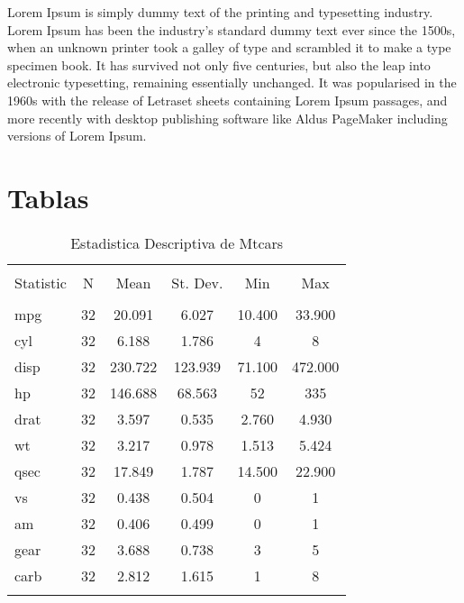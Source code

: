 \documentclass{article}
\begin{document}
\begin{blockquote}
Lorem Ipsum is simply dummy text of the printing and typesetting industry. Lorem Ipsum has been the industry's standard dummy text ever since the 1500s, when an unknown printer took a galley of type and scrambled it to make a type specimen book. It has survived not only five centuries, but also the leap into electronic typesetting, remaining essentially unchanged. It was popularised in the 1960s with the release of Letraset sheets containing Lorem Ipsum passages, and more recently with desktop publishing software like Aldus PageMaker including versions of Lorem Ipsum.
\end{blockquote}

\section{Tablas}

\begin{table}[!htbp] \centering 
  \caption{Estadistica Descriptiva de Mtcars} 
  \label{} 
\begin{tabular}{@{\extracolsep{5pt}}lccccc} 
\\[-1.8ex]\hline 
\hline \\[-1.8ex] 
Statistic & \multicolumn{1}{c}{N} & \multicolumn{1}{c}{Mean} & \multicolumn{1}{c}{St. Dev.} & \multicolumn{1}{c}{Min} & \multicolumn{1}{c}{Max} \\ 
\hline \\[-1.8ex] 
mpg & 32 & 20.091 & 6.027 & 10.400 & 33.900 \\ 
cyl & 32 & 6.188 & 1.786 & 4 & 8 \\ 
disp & 32 & 230.722 & 123.939 & 71.100 & 472.000 \\ 
hp & 32 & 146.688 & 68.563 & 52 & 335 \\ 
drat & 32 & 3.597 & 0.535 & 2.760 & 4.930 \\ 
wt & 32 & 3.217 & 0.978 & 1.513 & 5.424 \\ 
qsec & 32 & 17.849 & 1.787 & 14.500 & 22.900 \\ 
vs & 32 & 0.438 & 0.504 & 0 & 1 \\ 
am & 32 & 0.406 & 0.499 & 0 & 1 \\ 
gear & 32 & 3.688 & 0.738 & 3 & 5 \\ 
carb & 32 & 2.812 & 1.615 & 1 & 8 \\ 
\hline \\[-1.8ex] 
\end{tabular}
\end{table}


\printbibliography
\end{document}
